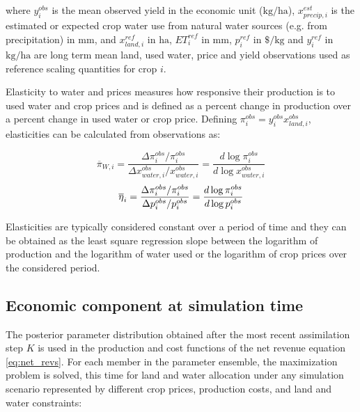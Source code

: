 \noindent where $y^{obs}_i$ is the mean observed yield in the economic unit ($\si{\kilo\gram\per\hectare}$),  $x^{est}_{precip,i}$ is the estimated or expected crop water use from natural water sources (e.g. from precipitation) in $\si{\milli\meter}$, and $x^{ref}_{land,i}$ in $\si{\hectare}$, $ET^{ref}_i$ in $\si{\milli\meter}$, $p^{ref}_i$ in $\$\si{\per\kilo\gram}$ and $y^{ref}_i$ in $\si{\kilo\gram\per\hectare}$ are long term mean land, used water, price and yield observations used as reference scaling quantities for crop $i$.

Elasticity to water and prices measures how responsive their production is to used water and crop prices and is defined as a percent change in production over a percent change in used water or crop price. Defining $\pi^{obs}_i = y^{obs}_i x^{obs}_{land,i}$, elasticities can be calculated from observations as: 

\begin{equation}
    \label{eq:elast_water}
    \overline{\pi}_{W,i} = \frac{\Delta \pi_i^{obs}/ \pi^{obs}_i}{\Delta x^{obs}_{water,i}/x^{obs}_{water,i}} = \frac{d\log \pi^{obs}_i}{d\log x^{obs}_{water,i}}
\end{equation}
\begin{equation}\label{eq:elast_supply}
    \overline{\eta}_i = \frac{\Delta \pi^{obs}_i/ \pi^{obs}_i}{\Delta p^{obs}_i/p^{obs}_i} = \frac{d\log \pi^{obs}_i}{d\log p^{obs}_i}\\
\end{equation}

Elasticities are typically considered constant over a period of time and they can be obtained as the least square regression slope between the logarithm of production and the logarithm of water used or the logarithm of crop prices over the considered period. 

\subsection{Economic component at simulation time}

The posterior parameter distribution obtained after the most recent assimilation step $K$ is used in the production and cost functions of the net revenue equation \eqref{eq:net_revs}. For each member in the parameter ensemble, the maximization problem is solved, this time for land and water allocation under any simulation scenario represented by different crop prices, production costs, and land and water constraints: 

